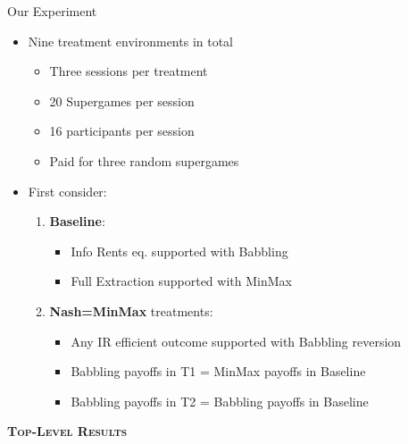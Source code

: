 \documentclass{beamer}
\begin{document}
\begin{frame}{Our Experiment}
\begin{itemize}
\item Nine treatment environments in total

\begin{itemize}
\item Three sessions per treatment
\item 20 Supergames per session
\item 16 participants per session
\item Paid for three random supergames
\end{itemize}
\item First consider:

\begin{enumerate}
\item \textbf{Baseline}:
\begin{itemize}
\item Info Rents eq. supported with Babbling
\item Full Extraction supported with MinMax
\end{itemize}
\item \textbf{Nash=MinMax} treatments: 
\begin{itemize}
\item Any IR efficient outcome supported with Babbling reversion
\item Babbling payoffs in T1 = MinMax payoffs in Baseline
\item Babbling payoffs in T2 = Babbling payoffs in Baseline
\end{itemize}
\end{enumerate}
\end{itemize}
\end{frame}

\begin{frame} 
\begin{center}

\textbf{\textsc{\huge{}Top-Level Results}}{\huge\par}

\end{center}\end{frame}
\end{document}
